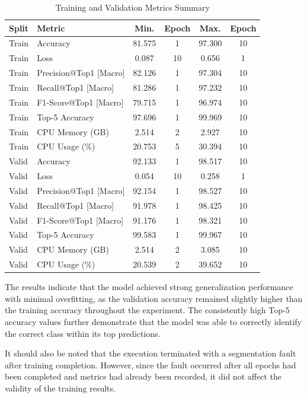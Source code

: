 \documentclass[11pt,a4paper]{article}
\begin{document}
\begin{table}[h]
\centering
\caption{Training and Validation Metrics Summary}
\begin{tabular}{|l|l|c|c|c|c|}
\hline
\textbf{Split} & \textbf{Metric} & \textbf{Min.} & \textbf{Epoch} & \textbf{Max.} & \textbf{Epoch} \\
\hline
Train & Accuracy & 81.575 & 1 & 97.300 & 10 \\
Train & Loss & 0.087 & 10 & 0.656 & 1 \\
Train & Precision@Top1 [Macro] & 82.126 & 1 & 97.304 & 10 \\
Train & Recall@Top1 [Macro] & 81.286 & 1 & 97.232 & 10 \\
Train & F1-Score@Top1 [Macro] & 79.715 & 1 & 96.974 & 10 \\
Train & Top-5 Accuracy & 97.696 & 1 & 99.969 & 10 \\
Train & CPU Memory (GB) & 2.514 & 2 & 2.927 & 10 \\
Train & CPU Usage (\%) & 20.753 & 5 & 30.394 & 10 \\
\hline
Valid & Accuracy & 92.133 & 1 & 98.517 & 10 \\
Valid & Loss & 0.054 & 10 & 0.258 & 1 \\
Valid & Precision@Top1 [Macro] & 92.154 & 1 & 98.527 & 10 \\
Valid & Recall@Top1 [Macro] & 91.978 & 1 & 98.425 & 10 \\
Valid & F1-Score@Top1 [Macro] & 91.176 & 1 & 98.321 & 10 \\
Valid & Top-5 Accuracy & 99.583 & 1 & 99.967 & 10 \\
Valid & CPU Memory (GB) & 2.514 & 2 & 3.085 & 10 \\
Valid & CPU Usage (\%) & 20.539 & 2 & 39.652 & 10 \\
\hline
\end{tabular}
\label{tab:cnn_metrics_summary}
\end{table}

The results indicate that the model achieved strong generalization performance with minimal overfitting, as the validation accuracy remained slightly higher than the training accuracy throughout the experiment. The consistently high Top-5 accuracy values further demonstrate that the model was able to correctly identify the correct class within its top predictions.

It should also be noted that the execution terminated with a segmentation fault after training completion. However, since the fault occurred after all epochs had been completed and metrics had already been recorded, it did not affect the validity of the training results. \\
\end{document}
